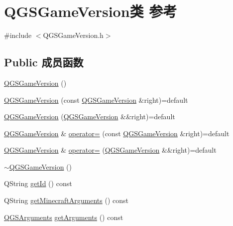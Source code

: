 \hypertarget{class_q_g_s_game_version}{}\section{Q\+G\+S\+Game\+Version类 参考}
\label{class_q_g_s_game_version}


{\ttfamily \#include $<$Q\+G\+S\+Game\+Version.\+h$>$}

\subsection*{Public 成员函数}
\begin{DoxyCompactItemize}
\item 
\mbox{\hyperlink{class_q_g_s_game_version_a21d7ee66426a4bdeab6c8d6c8a7ab487}{Q\+G\+S\+Game\+Version}} ()
\item 
\mbox{\hyperlink{class_q_g_s_game_version_a47704745dc57ddcf801fb0aea129766e}{Q\+G\+S\+Game\+Version}} (const \mbox{\hyperlink{class_q_g_s_game_version}{Q\+G\+S\+Game\+Version}} \&right)=default
\item 
\mbox{\hyperlink{class_q_g_s_game_version_aa09250fdecd3d7392d7eebfe0263cb2d}{Q\+G\+S\+Game\+Version}} (\mbox{\hyperlink{class_q_g_s_game_version}{Q\+G\+S\+Game\+Version}} \&\&right)=default
\item 
\mbox{\hyperlink{class_q_g_s_game_version}{Q\+G\+S\+Game\+Version}} \& \mbox{\hyperlink{class_q_g_s_game_version_a73e3b1597dfcfe65ca400dab9ed13a31}{operator=}} (const \mbox{\hyperlink{class_q_g_s_game_version}{Q\+G\+S\+Game\+Version}} \&right)=default
\item 
\mbox{\hyperlink{class_q_g_s_game_version}{Q\+G\+S\+Game\+Version}} \& \mbox{\hyperlink{class_q_g_s_game_version_a56cb03144a983256c4721b7f6ab5eaaf}{operator=}} (\mbox{\hyperlink{class_q_g_s_game_version}{Q\+G\+S\+Game\+Version}} \&\&right)=default
\item 
\mbox{\hyperlink{class_q_g_s_game_version_a9728a022baf0aa55627140c671746b25}{$\sim$\+Q\+G\+S\+Game\+Version}} ()
\item 
Q\+String \mbox{\hyperlink{class_q_g_s_game_version_a59094a106f76818cd6067062e0f7c60a}{get\+Id}} () const
\item 
Q\+String \mbox{\hyperlink{class_q_g_s_game_version_a649f244708613308853c398176289e1f}{get\+Minecraft\+Arguments}} () const
\item 
\mbox{\hyperlink{class_q_g_s_arguments}{Q\+G\+S\+Arguments}} \mbox{\hyperlink{class_q_g_s_game_version_ac114e4cdfff2db58a2e9a18b8ce003c8}{get\+Arguments}} () const

\end{DoxyCompactItemize}
